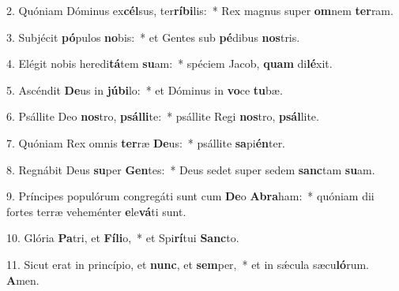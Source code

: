 2. Quóniam Dóminus ex\textbf{cél}sus, ter\textbf{rí}\textbf{bi}lis:~*  Rex magnus super \textbf{om}nem \textbf{ter}ram.\

3. Subjécit \textbf{pó}pulos \textbf{no}bis:~*  et Gentes sub \textbf{pé}dibus \textbf{nos}tris.\

4. Elégit nobis heredi\textbf{tá}tem \textbf{su}am:~*  spéciem Jacob, \textbf{quam} di\textbf{lé}xit.\

5. Ascéndit \textbf{De}us in \textbf{jú}\textbf{bi}lo:~*  et Dóminus in \textbf{vo}ce \textbf{tu}bæ.\

6. Psállite Deo \textbf{nos}tro, \textbf{psál}\textbf{li}te:~*  psállite Regi \textbf{nos}tro, \textbf{psál}lite.\

7. Quóniam Rex omnis \textbf{ter}ræ \textbf{De}us:~*  psállite \textbf{sa}pi\textbf{én}ter.\

8. Regnábit Deus \textbf{su}per \textbf{Gen}tes:~*  Deus sedet super sedem \textbf{sanc}tam \textbf{su}am.\

9. Príncipes populórum congregáti sunt cum \textbf{De}o \textbf{A}\textbf{bra}ham:~*  quóniam dii fortes terræ veheménter \textbf{e}le\textbf{vá}ti sunt.\

10. Glória \textbf{Pa}tri, et \textbf{Fí}\textbf{li}o,~*  et Spi\textbf{rí}tui \textbf{Sanc}to.\

11. Sicut erat in princípio, et \textbf{nunc}, et \textbf{sem}per,~*  et in sǽcula sæcu\textbf{ló}rum. \textbf{A}men.\

